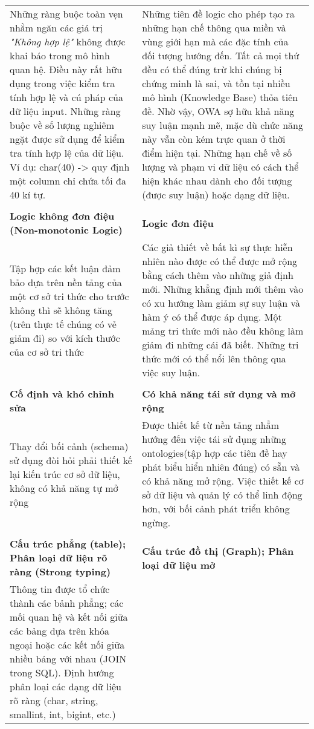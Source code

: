\begin{longtable}{ p{7cm} p{7cm} }
\\
Những ràng buộc toàn vẹn nhằm ngăn các giá trị \textit{"Không hợp lệ"} không được khai báo trong mô hình quan hệ. Điều này rất hữu dụng trong việc kiểm tra tính hợp lệ và cú pháp của dữ liệu input. Những ràng buộc về số lượng nghiêm ngặt được sử dụng để kiểm tra tính hợp lệ của dữ liệu. Ví dụ: char(40) -> quy định một column chỉ chứa tối đa 40 kí tự.
&
Những tiên đề logic cho phép tạo ra những hạn chế thông qua miền và vùng giới hạn mà các đặc tính của đối tượng hướng đến. Tất cả mọi thứ đều có thể đúng trừ khi chúng bị chứng minh là sai, và tồn tại nhiều mô hình (Knowledge Base) thỏa tiên đề. Nhờ vậy, OWA sợ hữu khả năng suy luận mạnh mẽ, mặc dù chức năng này vẫn còn kém trực quan ở thời điểm hiện tại. Những hạn chế về số lượng và phạm vi dữ liệu có cách thể hiện khác nhau dành cho đối tượng (được suy luận) hoặc dạng dữ liệu.
\\
&
\\
\textbf{Logic không đơn điệu (Non-monotonic Logic)}
&
\textbf{Logic đơn điệu}
\\
Tập hợp các kết luận đảm bảo dựa trên nền tảng của một cơ sở tri thức cho trước không thì sẽ không tăng (trên thực tế chúng có vẻ giảm đi) so với kích thước của cơ sở tri thức 
&
Các giả thiết về bất kì sự thực hiễn nhiên nào được có thể được mở rộng bằng cách thêm vào những giả định mới. Những khẳng định mới thêm vào có xu hướng làm giảm sự suy luận và hàm ý có thể được áp dụng. Một mảng tri thức mới nào đều không làm giảm đi những cái đã biết. Những tri thức mới có thể nổi lên thông qua việc suy luận.
\\
&
\\
\textbf{Cố định và khó chỉnh sửa}
&
\textbf{Có khả năng tái sử dụng và mở rộng}
\\
Thay đổi bối cảnh (schema) sử dụng đòi hỏi phải thiết kế lại kiến trúc cơ sở dữ liệu, không có khả năng tự mở rộng& Được thiết kế từ nền tảng nhẳm hướng đến việc tái sử dụng những ontologies(tập hợp các tiên đề hay phát biểu hiển nhiên đúng) có sẵn và có khả năng mở rộng. Việc thiết kế cơ sở dữ liệu và quản lý có thể linh động hơn, với bối cảnh phát triển không ngừng.
\\
&
\\
\textbf{Cấu trúc phẳng (table); Phân loại dữ liệu rõ ràng (Strong typing) }
 &
\textbf{Cấu trúc đồ thị (Graph); Phân loại dữ liệu mở}
\\
Thông tin được tổ chức thành các bảnh phẳng; các mối quan hệ và kết nối giữa các bảng dựa trên khóa ngoại hoặc các kết nối giữa nhiều bảng với nhau (JOIN trong SQL). Định hướng phân loại các dạng dữ liệu rõ ràng (char, string, smallint, int, bigint, etc.)  
&


\end{longtable}
